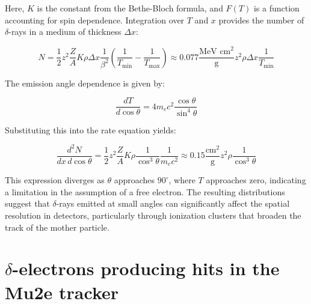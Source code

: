 Here, $K$ is the constant from the Bethe-Bloch formula, 
and $F(T)$ is a function accounting for spin dependence. 
Integration over $T$ and $x$ provides the number of $\delta$-rays in a medium of thickness $\Delta x$:

\begin{equation}
N = \frac{1}{2} z^2 \frac{Z}{A} K \rho \Delta x \frac{1}{\beta^2} \left(\frac{1}{T_{\text{min}}} - \frac{1}{T_{\text{max}}}\right) \approx 0.077 \frac{\text{MeV cm}^2}{\text{g}} z^2 \rho \Delta x \frac{1}{T_{\text{min}}}
\end{equation}

The emission angle dependence is given by:

\begin{equation}
\frac{dT}{d \cos \theta} = 4 m_e c^2 \frac{\cos \theta}{\sin^4 \theta}
\end{equation}

Substituting this into the rate equation yields:

\begin{equation}
\frac{d^2 N}{dx \, d \cos \theta} = \frac{1}{2} z^2 \frac{Z}{A} K \rho \frac{1}{\cos^3 \theta} \frac{1}{m_e c^2} \approx 0.15 \frac{\text{cm}^2}{\text{g}} z^2 \rho \frac{1}{\cos^3 \theta}
\end{equation}

This expression diverges as $\theta$ approaches $90^\circ$, 
where $T$ approaches zero, indicating a limitation in the 
assumption of a free electron. The resulting distributions 
suggest that $\delta$-rays emitted at small angles can 
significantly affect the spatial resolution in detectors, 
particularly through ionization clusters that broaden the 
track of the mother particle.


\section{$\delta$-electrons producing hits in the Mu2e tracker}

